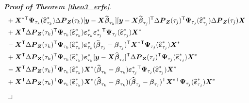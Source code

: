 \documentclass[15pt,a4paper]{article}
\newcommand{\transpose}{{}^{\text{\sffamily T}}}
\begin{document}
\begin{proof}[\textbf{Proof of Theorem \ref{theo3_erfe}}]
\begin{equation*}
\begin{split}
& + \boldsymbol{X}^{*}\transpose\boldsymbol{\Psi}_{\tau_k}(\widehat{\boldsymbol{\varepsilon}}^{*}_{\tau_k})\Delta\boldsymbol{P}_{\boldsymbol{Z}}(\tau_{k})[\boldsymbol{y}-\boldsymbol{X}\widehat{\boldsymbol{\beta}}_{\tau_{k}}]
    [\boldsymbol{y}-\boldsymbol{X}\widehat{\boldsymbol{\beta}}_{\tau_{j}}]\transpose\Delta\boldsymbol{P}_{\boldsymbol{Z}}(\tau_{j})\transpose\boldsymbol{\Psi}_{\tau_j}(\widehat{\boldsymbol{\varepsilon}}^{*}_{\tau_j})
    \Delta\boldsymbol{P}_{\boldsymbol{Z}}(\tau_j)\boldsymbol{X}\\
& + \boldsymbol{X}\transpose\Delta\boldsymbol{P}_{\boldsymbol{Z}}(\tau_k)\transpose\boldsymbol{\Psi}_{\tau_k}(\widehat{\boldsymbol{\varepsilon}}^{*}_{\tau_k})\boldsymbol{\varepsilon}^{*}_{\tau_{k}}\boldsymbol{\varepsilon}^{*}_{\tau_{j}}\transpose
        \boldsymbol{\Psi}_{\tau_j}(\widehat{\boldsymbol{\varepsilon}}^{*}_{\tau_j})\boldsymbol{X}^{*} \\
& - \boldsymbol{X}\transpose\Delta\boldsymbol{P}_{\boldsymbol{Z}}(\tau_k)\transpose\boldsymbol{\Psi}_{\tau_k}(\widehat{\boldsymbol{\varepsilon}}^{*}_{\tau_k})\boldsymbol{\varepsilon}^{*}_{\tau_{k}}(\widehat{\boldsymbol{\beta}}_{\tau_{j}} -   
        \boldsymbol{\beta}_{\tau_{j}})\transpose\boldsymbol{X}^{*}\transpose\boldsymbol{\Psi}_{\tau_j}(\widehat{\boldsymbol{\varepsilon}}^{*}_{\tau_j})\boldsymbol{X}^{*}\\
& + \boldsymbol{X}\transpose\Delta\boldsymbol{P}_{\boldsymbol{Z}}(\tau_k)\transpose\boldsymbol{\Psi}_{\tau_k}(\widehat{\boldsymbol{\varepsilon}}^{*}_{\tau_k})\boldsymbol{\varepsilon}^{*}_{\tau_{k}}[\boldsymbol{y}-\boldsymbol{X}
        \widehat{\boldsymbol{\beta}}_{\tau_{j}}]\transpose\Delta\boldsymbol{P}_{\boldsymbol{Z}}(\tau_{j})\transpose\boldsymbol{\Psi}_{\tau_j}(\widehat{\boldsymbol{\varepsilon}}^{*}_{\tau_j})\boldsymbol{X}^{*}\\
& - \boldsymbol{X}\transpose\Delta\boldsymbol{P}_{\boldsymbol{Z}}(\tau_k)\transpose\boldsymbol{\Psi}_{\tau_k}(\widehat{\boldsymbol{\varepsilon}}^{*}_{\tau_k})\boldsymbol{X}^{*} (\widehat{\boldsymbol{\beta}}_{\tau_{k}} -   
        \boldsymbol{\beta}_{\tau_{k}})\boldsymbol{\varepsilon}^{*}_{\tau_{j}}\transpose\boldsymbol{\Psi}_{\tau_j}(\widehat{\boldsymbol{\varepsilon}}^{*}_{\tau_j})\boldsymbol{X}^{*}\\
& + \boldsymbol{X}\transpose\Delta\boldsymbol{P}_{\boldsymbol{Z}}(\tau_k)\transpose\boldsymbol{\Psi}_{\tau_k}(\widehat{\boldsymbol{\varepsilon}}^{*}_{\tau_k})\boldsymbol{X}^{*} (\widehat{\boldsymbol{\beta}}_{\tau_{k}} -   
    \boldsymbol{\beta}_{\tau_{k}})(\widehat{\boldsymbol{\beta}}_{\tau_{j}} - \boldsymbol{\beta}_{\tau_{j}})\transpose\boldsymbol{X}^{*}\transpose\boldsymbol{\Psi}_{\tau_j}(\widehat{\boldsymbol{\varepsilon}}^{*}_{\tau_j})\boldsymbol{X}^{*}\\

\end{split}
\end{equation*}
\end{proof}
\end{document}
